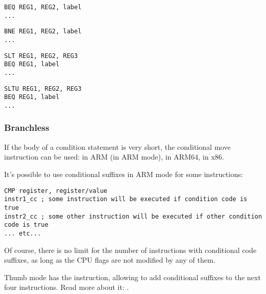 \begin{lstlisting}[caption=Check for equal values,style=customasmMIPS]
BEQ REG1, REG2, label
...
\end{lstlisting}

\begin{lstlisting}[caption=Check for non-equal values,style=customasmMIPS]
BNE REG1, REG2, label
...
\end{lstlisting}

\begin{lstlisting}[caption=Check for less than{,} greater than (signed),style=customasmMIPS]
SLT REG1, REG2, REG3
BEQ REG1, label
...
\end{lstlisting}

\begin{lstlisting}[caption=Check for less than{,} greater than (unsigned),style=customasmMIPS]
SLTU REG1, REG2, REG3
BEQ REG1, label
...
\end{lstlisting}

\subsubsection{Branchless}

If the body of a condition statement is very short, the conditional move instruction can be used: 
 in ARM (in ARM mode),  in ARM64,  in x86.


It's possible to use conditional suffixes in ARM mode for some instructions:

\begin{lstlisting}[caption=ARM (\ARMMode),style=customasmARM]
CMP register, register/value
instr1_cc ; some instruction will be executed if condition code is true
instr2_cc ; some other instruction will be executed if other condition code is true
... etc...
\end{lstlisting}

Of course, there is no limit for the number of instructions with conditional code suffixes, 
as long as the CPU flags are not modified by any of them.


Thumb mode has the  instruction, allowing to add conditional suffixes to the next four instructions.
Read more about it: .

